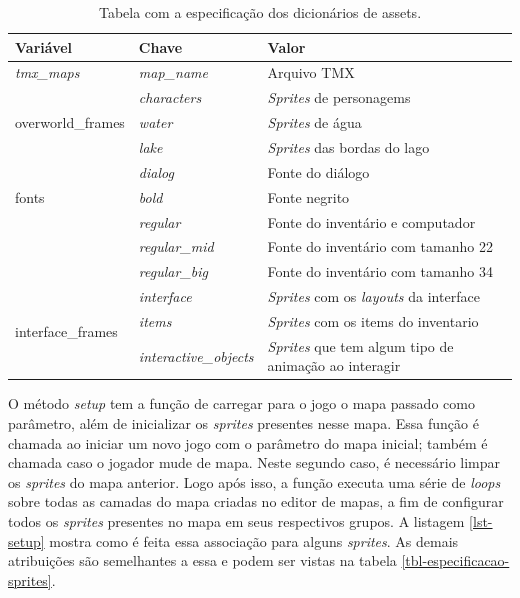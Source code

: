 \begin{table}[h!]
	\caption{Tabela com a especificação dos dicionários de assets.}
	\label{tbl-especificacao-dicionario}
	\centering
	\renewcommand{\arraystretch}{2}
	\begin{small}
		\begin{tabular}{ | p{35mm} | p{35mm} | p{65mm} |}\hline \rowcolor{MidnightBlue}
                \hline
                Variável & Chave & Valor \\
                \hline
                \textit{tmx\_maps} & \textit{map\_name} & Arquivo TMX \\ 
                \hline
                \multirow{3}{4em}{overworld\_frames} 
                & \textit{characters} & \textit{Sprites} de personagems \\ 
                & \textit{water} & \textit{Sprites} de água \\ 
                & \textit{lake} & \textit{Sprites} das bordas do lago \\ 
                \hline
                \multirow{3}{4em}{fonts} 
                & \textit{dialog} & Fonte do diálogo \\ 
                & \textit{bold} & Fonte negrito \\ 
                & \textit{regular} & Fonte do inventário e computador \\ 
                & \textit{regular\_mid} & Fonte do inventário com tamanho 22 \\ 
                & \textit{regular\_big} & Fonte do inventário  com tamanho 34 \\ 
                \hline
                \multirow{3}{4em}{interface\_frames} 
                & \textit{interface} & \textit{Sprites} com os \textit{layouts} da interface \\ 
                & \textit{items} & \textit{Sprites} com os items do inventario \\ 
                & \textit{interactive\_objects} & \textit{Sprites} que tem algum tipo de animação ao interagir \\ 
                \hline

                \end{tabular}
	\end{small}
\end{table}

\clearpage


O método \textit{setup} tem a função de carregar para o jogo o mapa passado como parâmetro, além de inicializar os \textit{sprites} presentes nesse mapa. Essa função é chamada ao iniciar um novo jogo com o parâmetro do mapa inicial; também é chamada caso o jogador mude de mapa. Neste segundo caso, é necessário limpar os \textit{sprites} do mapa anterior. Logo após isso, a função executa uma série de \textit{loops} sobre todas as camadas do mapa criadas no editor de mapas, a fim de configurar todos os \textit{sprites} presentes no mapa em seus respectivos grupos. 
A listagem \ref{lst-setup} mostra como é feita essa associação para alguns \textit{sprites}. As demais atribuições são semelhantes a essa e podem ser vistas na tabela \ref{tbl-especificacao-sprites}.

